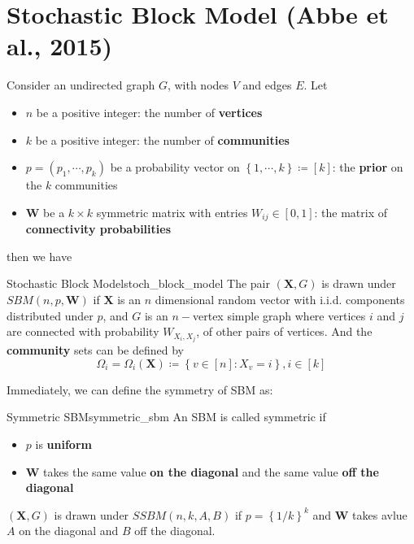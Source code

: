 \documentclass[twoside]{article}
\begin{document}

\section{Stochastic Block Model (Abbe et al., 2015)}

Consider an undirected graph $G$, with nodes $V$ and edges $E$. Let 
    \begin{itemize}
        \item $n$ be a positive integer: the number of \textbf{vertices}
        \item $k$ be a positive integer: the number of \textbf{communities}
        \item $p=\left(p_1,\cdots,p_k\right)$ be a probability vector on $\left\{ 1,\cdots,k \right\} \coloneq [k]$: the \textbf{prior} on the $k$ communities
        \item $\mathbf{W}$ be a $k\times k$ symmetric matrix with entries $ W_{ij}\in [0,1]$: the matrix of \textbf{connectivity probabilities}
    \end{itemize}
then we have
\begin{definition}{Stochastic Block Model}{stoch_block_model}
    The pair $(\mathbf{X},G)$ is drawn under $SBM(n,p,\mathbf{W})$ if $\mathbf{X}$ is an $n$ dimensional random vector with i.i.d. components distributed under $p$, and $G$ is an $n-$vertex simple graph 
    where vertices $i$ and $j$ are connected with probability $W_{X_i,X_j}$,  of other pairs of vertices. And the \textbf{community} sets can be defined by 
    \begin{equation*}
        \Omega_i = \Omega_i(\mathbf{X}) \coloneq \left\{ v\in [n]: X_v=i \right\}, i\in [k]
    \end{equation*}
\end{definition}
Immediately, we can define the symmetry of SBM as:
\begin{definition}{Symmetric SBM}{symmetric_sbm}
    An SBM is called symmetric if
    \begin{itemize}
        \item $p$ is \textbf{uniform}
        \item $\mathbf{W}$ takes the same value \textbf{on the diagonal} and the same value \textbf{off the diagonal} 
    \end{itemize}
    $(\mathbf{X},G)$ is drawn under $SSBM(n,k,A,B)$ if $p=\left\{ 1/k \right\}^k$ and $\mathbf{W}$ takes avlue $A$ on the diagonal and $B$ off the diagonal.
\end{definition}
\end{document}
